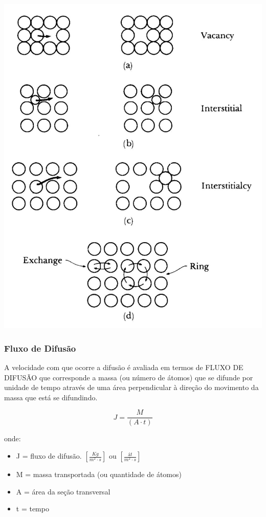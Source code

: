 \includegraphics[scale=0.45,trim={0 0 0 0}]{figures/difusao}


\subsubsection{Fluxo de Difusão}

A velocidade com que ocorre a difusão é avaliada em termos de FLUXO DE DIFUSÃO que corresponde a massa (ou número de átomos) que se difunde por unidade de tempo através de uma área perpendicular à direção do movimento da massa que está se difundindo.

\begin{equation}\label{key}
J = \frac{M}{(A \cdot t)}
\end{equation}

onde: 

\begin{itemize}
	\item J = fluxo de difusão. $[\frac{Kg}{m^{2} \cdot s}]$ ou $[\frac{át}{m^{2} \cdot s}]$
	\item M = massa transportada (ou quantidade de átomos)
	\item A = área da seção transversal
	\item t = tempo
\end{itemize}


